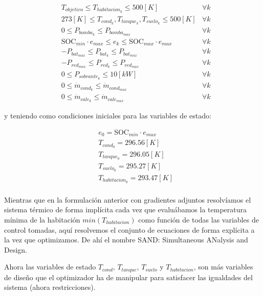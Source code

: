 \begin{align}
	 & T_{objetivo} \leq T_{habitacion_k} \leq 500[K]  \label{eq:min_t_habitacion_constraint_sand} & \forall k \\
	 & 273[K] \leq T_{cond_k}, T_{tanque_k}, T_{suelo_k} \leq 500[K]                               & \forall k \\
	 & 0 \leq P_{bomba_k} \leq P_{bomba_{max}} \quad                                               & \forall k \\
	 & \text{SOC}_{min} \cdot e_{max} \leq e_k \leq \text{SOC}_{max} \cdot e_{max} \quad           & \forall k \\
	 & -P_{bat_{max}} \leq P_{bat_k} \leq P_{bat_{max}} \quad                                      & \forall k \\
	 & -P_{red_{max}} \leq P_{red_k} \leq P_{red_{max}} \quad                                      & \forall k \\
	 & 0 \leq P_{sobrante_k} \leq 10[kW] \quad                                                     & \forall k \\
	 & 0 \leq \dot{m}_{cond_k} \leq \dot{m}_{cond_{max}} \quad                                     & \forall k \\
	 & 0 \leq \dot{m}_{cale_k} \leq \dot{m}_{cale_{max}} \quad                                     & \forall k
\end{align}

y teniendo como condiciones iniciales para las variables de estado:

\begin{align}
	 & e_0 = \text{SOC}_{min} \cdot e_{max} \\
	 & T_{cond_0} = 296.56 [K]              \\
	 & T_{tanque_0} = 296.05[K]             \\
	 & T_{suelo_0} = 295.27[K]              \\
	 & T_{habitacion_0} = 293.47[K]         \\
\end{align}


Mientras que en la formulación anterior con gradientes adjuntos resolvíamos el
sistema térmico de forma implícita cada vez que evaluábamos la temperatura
mínima de la habitación $min(T_{habitacion})$ como función de todas las
variables de control tomadas, aquí resolvemos el conjunto de ecuaciones de
forma explícita a la vez que optimizamos. De ahí el nombre SAND: Simultaneous
ANalysis and Design.

Ahora las variables de estado $T_{cond}$, $T_{tanque}$, $T_{suelo}$ y
$T_{habitacion}$, son más variables de diseño que el optimizador ha de
manipular para satisfacer las igualdades del sistema (ahora restricciones).

